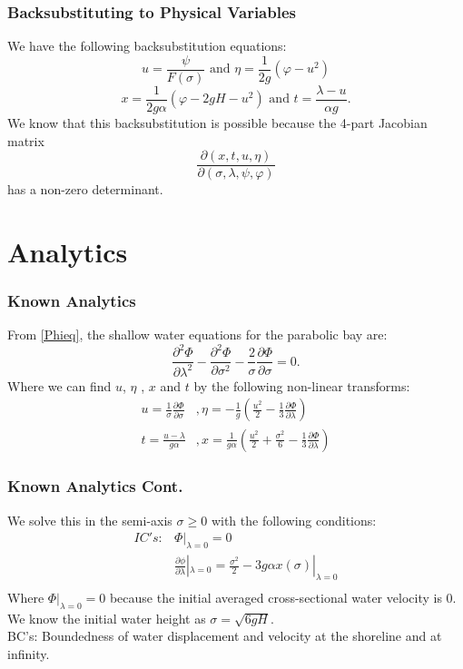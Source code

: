 \begin{frame}
\frametitle{Backsubstituting to Physical Variables}
We have the following backsubstitution equations:
\[
u = \frac{\psi}{F(\sigma)} \text{ and } \eta = \frac{1}{2g}\left(\varphi - u^2\right)
\]
\[
x = \frac{1}{2g\alpha} \left(\varphi - 2gH - u^2 \right) \text{ and } t = \frac{\lambda - u}{\alpha g}.
\]
We know that this backsubstitution is possible because the 4-part Jacobian matrix
\[
\frac{\partial (x,t,u,\eta)}{\partial (\sigma,\lambda,\psi,\varphi)}
\]
has a non-zero determinant.
\end{frame}

\section{Analytics}

\begin{frame}
\frametitle{Known Analytics}
From \eqref{Phieq}, the shallow water equations for the parabolic bay are: 
\[
\frac{\partial^2 \Phi}{\partial \lambda^2}-\frac{\partial^2 \Phi}{\partial \sigma^2}-\frac{2}{\sigma}\frac{\partial \Phi}{\partial \sigma}=0.
\]
Where we can find $u$, $\eta$ , $x$ and $t$ by the following non-linear transforms:\\
\begin{align*}
u=\frac{1}{\sigma}\frac{\partial \Phi}{\partial \sigma}&, \eta=-\frac{1}{g}\left(\frac{u^2}{2}-\frac{1}{3}\frac{\partial \Phi}{\partial \lambda}\right)\\
t=\frac{u-\lambda}{g\alpha}&,x=\frac{1}{g\alpha}\left(\frac{u^2}{2}+\frac{\sigma^2}{6}-\frac{1}{3}\frac{\partial \Phi}{\partial \lambda}\right)
\end{align*}
\end{frame}


\begin{frame}
\frametitle{Known Analytics Cont.}
We solve this in the semi-axis $\sigma \geq 0$ with the following conditions: \\
\begin{align*}
IC's:& \Phi|_{\lambda=0}=0\\
&\frac{\partial\phi}{\partial \lambda}|_{\lambda=0}=\frac{\sigma^2}{2}-3g\alpha x(\sigma)|_{\lambda=0}\\
\end{align*}
Where $\Phi|_{\lambda=0}=0$ because the initial averaged cross-sectional water velocity is 0. We know the initial water height as $\sigma=\sqrt{6gH}$.
\\ \vspace{3mm}
BC's: Boundedness of water displacement and velocity at the shoreline and at infinity.
\end{frame}

